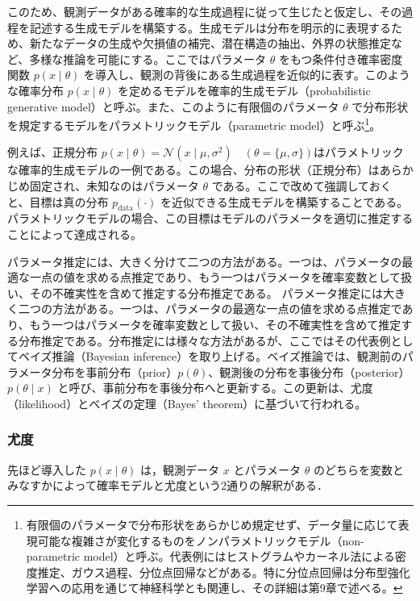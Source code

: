 \documentclass[titlepage]{ltjsbook}
\begin{document}
このため、観測データがある確率的な生成過程に従って生じたと仮定し、その過程を記述する生成モデルを構築する。生成モデルは分布を明示的に表現するため、新たなデータの生成や欠損値の補完、潜在構造の抽出、外界の状態推定など、多様な推論を可能にする。ここではパラメータ $\theta$ をもつ条件付き確率密度関数 $p(x \mid \theta)$ を導入し、観測の背後にある生成過程を近似的に表す。このような確率分布 $p(x \mid \theta)$ を定めるモデルを確率的生成モデル（probabilistic generative model）と呼ぶ。また、このように有限個のパラメータ $\theta$ で分布形状を規定するモデルをパラメトリックモデル（parametric model）と呼ぶ\footnote{有限個のパラメータで分布形状をあらかじめ規定せず、データ量に応じて表現可能な複雑さが変化するものをノンパラメトリックモデル（non-parametric model）と呼ぶ。代表例にはヒストグラムやカーネル法による密度推定、ガウス過程、分位点回帰などがある。特に分位点回帰は分布型強化学習への応用を通じて神経科学とも関連し、その詳細は第9章で述べる。}。

例えば、正規分布 $p(x \mid \theta) = \mathcal{N}(x \mid \mu, \sigma^2)\quad \left(\theta = \{\mu, \sigma\}\right)$はパラメトリックな確率的生成モデルの一例である。この場合、分布の形状（正規分布）はあらかじめ固定され、未知なのはパラメータ $\theta$ である。ここで改めて強調しておくと、目標は真の分布 $p_{\mathrm{data}}(\cdot)$ を近似できる生成モデルを構築することである。パラメトリックモデルの場合、この目標はモデルのパラメータを適切に推定することによって達成される。

パラメータ推定には、大きく分けて二つの方法がある。一つは、パラメータの最適な一点の値を求める点推定であり、もう一つはパラメータを確率変数として扱い、その不確実性を含めて推定する分布推定である。
パラメータ推定には大きく二つの方法がある。一つは、パラメータの最適な一点の値を求める点推定であり、もう一つはパラメータを確率変数として扱い、その不確実性を含めて推定する分布推定である。分布推定には様々な方法があるが、ここではその代表例としてベイズ推論（Bayesian inference）を取り上げる。ベイズ推論では、観測前のパラメータ分布を事前分布（prior）$p(\theta)$、観測後の分布を事後分布（posterior）$p(\theta \mid x)$ と呼び、事前分布を事後分布へと更新する。この更新は、尤度（likelihood）とベイズの定理（Bayes’ theorem）に基づいて行われる。

\subsubsection{尤度}
先ほど導入した $p(x \mid \theta)$ は，観測データ $x$ とパラメータ $\theta$ のどちらを変数とみなすかによって確率モデルと尤度という2通りの解釈がある．
\end{document}
